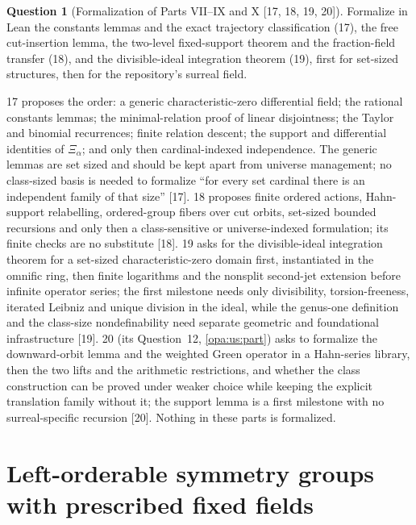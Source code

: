 \documentclass[11pt,oneside]{article}
\numberwithin{equation}{section}
\theoremstyle{definition}
\newtheorem{question}[question]{Question}
\theoremstyle{remark}
\newcommand{\src}[1]{\textup{\textsf{\small[#1]}}}
\begin{document}
\begin{question}[Formalization of Parts VII--IX and X \src{17, 18, 19, 20}]\label{opa:of:q:formal}
Formalize in Lean the constants lemmas and the exact trajectory classification (17), the free cut-insertion lemma, the two-level
fixed-support theorem and the fraction-field transfer (18), and the divisible-ideal integration theorem (19), first for set-sized
structures, then for the repository's surreal field.
\end{question}
17 proposes the order: a generic characteristic-zero differential field; the rational constants lemmas; the minimal-relation proof
of linear disjointness; the Taylor and binomial recurrences; finite relation descent; the support and differential identities of
$\Xi_\alpha$; and only then cardinal-indexed independence. The generic lemmas are set sized and should be kept apart from universe
management; no class-sized basis is needed to formalize ``for every set cardinal there is an independent family of that size''
\src{17}. 18 proposes finite ordered actions, Hahn-support relabelling, ordered-group fibers over cut orbits, set-sized bounded
recursions and only then a class-sensitive or universe-indexed formulation; its finite checks are no substitute \src{18}. 19 asks
for the divisible-ideal integration theorem for a set-sized characteristic-zero domain first, instantiated in the omnific ring, then
finite logarithms and the nonsplit second-jet extension before infinite operator series; the first milestone needs only
divisibility, torsion-freeness, iterated Leibniz and unique division in the ideal, while the genus-one definition and the
class-size nondefinability need separate geometric and foundational infrastructure \src{19}. 20 (its Question~12, \cref{opa:us:part})
asks to formalize the downward-orbit lemma and the weighted Green operator in a Hahn-series library, then the two lifts and the arithmetic
restrictions, and whether the class construction can be proved under weaker choice while keeping the explicit translation family without it;
the support lemma is a first milestone with no surreal-specific recursion \src{20}. Nothing in these parts is formalized.

\part{Left-orderable symmetry groups with prescribed fixed fields}\label{opa:es:part}
\end{document}
